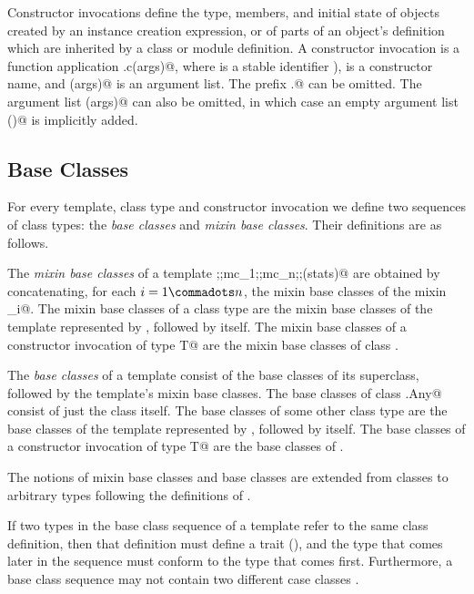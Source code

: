 \documentclass[11pt]{report}
\begin{document}
Constructor invocations define the type, members, and initial state of
objects created by an instance creation expression, or of parts of an
object's definition which are inherited by a class or module
definition. A constructor invocation is a function application 
\verb@x.c(args)@, where \verb@x@ is a stable identifier
), \verb@c@ is a constructor name, and
\verb@(args)@ is an argument list. The prefix \verb@x.@ can be
omitted. The argument list \verb@(args)@ can also be omitted, in which
case an empty argument list \verb@()@ is implicitly added.

\subsection{Base Classes}
\label{sec:base-classes}

For every template, class type and constructor invocation we define two
sequences of class types: the {\em base classes} and {\em mixin base
classes}. Their definitions are as follows.

The {\em mixin base classes} of a template
\verb@sc;\WITH;mc_1;\WITH;mc_n;\WITH;(stats)@ are obtained by
concatenating, for each $i = 1 \commadots n$, the mixin base classes
of the mixin \verb@mc_i@. The mixin base classes of a class type \verb@C@ are
the mixin base classes of the template represented by \verb@C@, followed by
\verb@C@ itself. The mixin base classes of a constructor invocation of type
\verb@class T@ are the mixin base classes of class \verb@T@.

The {\em base classes} of a template consist of the base classes of
its superclass, followed by the template's mixin base classes.  The
base classes of class \verb@scala.Any@ consist of just the
class itself. The base classes of some other class type \verb@C@ are the
base classes of the template represented by \verb@C@, followed by \verb@C@
itself.  The base classes of a constructor invocation of type \verb@class T@
are the base classes of \verb@T@.

The notions of mixin base classes and base classes are extended from
classes to arbitrary types following the definitions of
.
 
If two types in the base class sequence of a template refer to the
same class definition, then that definition must define a trait
(), and the type that comes later in the sequence must
conform to the type that comes first. Furthermore, a base class
sequence may not contain two different case classes
.
\end{document}
